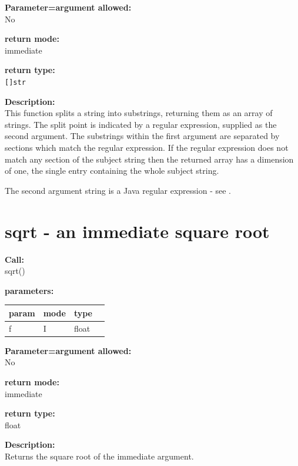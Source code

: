         {\bf Parameter=argument allowed:} \\
        No
        
        {\bf return mode:} \\
        immediate

        {\bf return type:} \\
        \verb'[]str'
        
        {\bf Description:} \\
        This function splits a string into substrings, returning them as an array
        of strings. The split point is indicated by a regular expression, supplied
        as the second argument. The substrings within the first argument are
        separated by sections which match the regular expression. If the regular
        expression does not match any section of the subject string then the returned
        array has a dimension of one, the single entry containing the whole subject
        string.     
        
        The second argument string is a Java regular expression - 
        see .


    \section{sqrt - an immediate square root}\label{sec:ifsqrt}
            
        {\bf Call:} \\
        sqrt()
        
        {\bf parameters:} \\
        \begin{tabular}{| l | l | l | l |}
        \hline
        param  & mode & type & \\
        \hline \hline
        f & I & float & \\ \hline
        \end{tabular}
        
        {\bf Parameter=argument allowed:} \\
        No
        
        {\bf return mode:} \\
        immediate

        {\bf return type:} \\
        float
        
        {\bf Description:} \\
        Returns the square root of the immediate argument.
 

